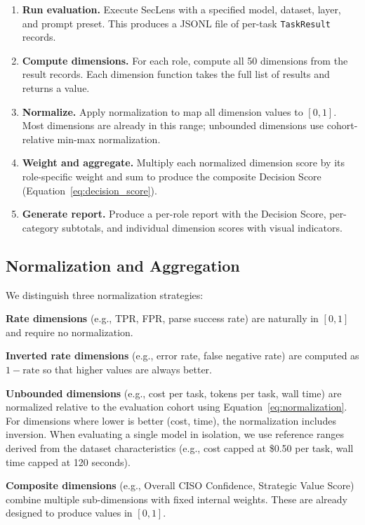 \documentclass[10pt,twocolumn]{article}
\newcommand{\seclens}{SecLens\xspace}
\begin{document}
\begin{enumerate}[noitemsep,topsep=2pt]
    \item \textbf{Run evaluation.} Execute \seclens with a specified model, dataset, layer, and prompt preset. This produces a JSONL file of per-task \texttt{TaskResult} records.
    \item \textbf{Compute dimensions.} For each role, compute all 50 dimensions from the result records. Each dimension function takes the full list of results and returns a value.
    \item \textbf{Normalize.} Apply normalization to map all dimension values to $[0, 1]$. Most dimensions are already in this range; unbounded dimensions use cohort-relative min-max normalization.
    \item \textbf{Weight and aggregate.} Multiply each normalized dimension score by its role-specific weight and sum to produce the composite Decision Score (Equation~\ref{eq:decision_score}).
    \item \textbf{Generate report.} Produce a per-role report with the Decision Score, per-category subtotals, and individual dimension scores with visual indicators.
\end{enumerate}

\subsection{Normalization and Aggregation}
\label{sec:normalization}

We distinguish three normalization strategies:

\textbf{Rate dimensions} (e.g., TPR, FPR, parse success rate) are naturally in $[0, 1]$ and require no normalization.

\textbf{Inverted rate dimensions} (e.g., error rate, false negative rate) are computed as $1 - \text{rate}$ so that higher values are always better.

\textbf{Unbounded dimensions} (e.g., cost per task, tokens per task, wall time) are normalized relative to the evaluation cohort using Equation~\ref{eq:normalization}. For dimensions where lower is better (cost, time), the normalization includes inversion. When evaluating a single model in isolation, we use reference ranges derived from the dataset characteristics (e.g., cost capped at \$0.50 per task, wall time capped at 120 seconds).

\textbf{Composite dimensions} (e.g., Overall CISO Confidence, Strategic Value Score) combine multiple sub-dimensions with fixed internal weights. These are already designed to produce values in $[0, 1]$.
\end{document}
